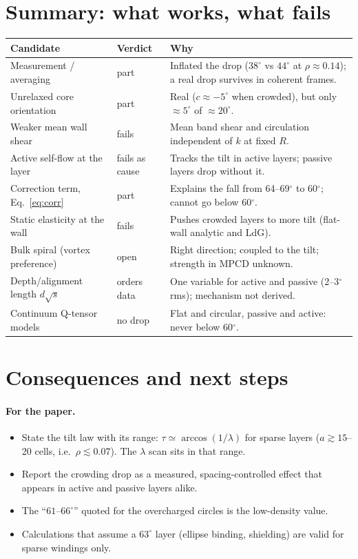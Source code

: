 \documentclass[11pt,a4paper]{article}
\begin{document}

\section{Summary: what works, what fails}

\begin{center}\small
\begin{tabular}{p{4.1cm}p{1.9cm}p{8.6cm}}
\toprule
Candidate & Verdict & Why \\
\midrule
Measurement / averaging & part & Inflated the drop ($38^\circ$ vs $44^\circ$ at $\rho\approx0.14$); a real drop survives in coherent frames. \\
Unrelaxed core orientation & part & Real ($c\approx-5^\circ$ when crowded), but only $\approx5^\circ$ of $\approx20^\circ$. \\
Weaker mean wall shear & fails & Mean band shear and circulation independent of $k$ at fixed $R$. \\
Active self-flow at the layer & fails as cause & Tracks the tilt in active layers; passive layers drop without it. \\
Correction term, Eq.~\eqref{eq:corr} & part & Explains the fall from 64--69$^\circ$ to 60$^\circ$; cannot go below 60$^\circ$. \\
Static elasticity at the wall & fails & Pushes crowded layers to more tilt (flat-wall analytic and LdG). \\
Bulk spiral (vortex preference) & open & Right direction; coupled to the tilt; strength in MPCD unknown. \\
Depth/alignment length $d\sqrt{s}$ & orders data & One variable for active and passive (2--3$^\circ$ rms); mechanism not derived. \\
Continuum Q-tensor models & no drop & Flat and circular, passive and active: never below 60$^\circ$. \\
\bottomrule
\end{tabular}
\end{center}

\section{Consequences and next steps}

\paragraph{For the paper.}
\begin{itemize}
\item State the tilt law with its range: $\tau\simeq\arccos(1/\lambda)$ for sparse layers ($a\gtrsim15$--20 cells, i.e.\ $\rho\lesssim0.07$). The $\lambda$ scan sits in that range.
\item Report the crowding drop as a measured, spacing-controlled effect that appears in active and passive layers alike.
\item The ``$61$--$66^\circ$'' quoted for the overcharged circles is the low-density value.
\item Calculations that assume a $63^\circ$ layer (ellipse binding, shielding) are valid for sparse windings only.
\end{itemize}
\end{document}
